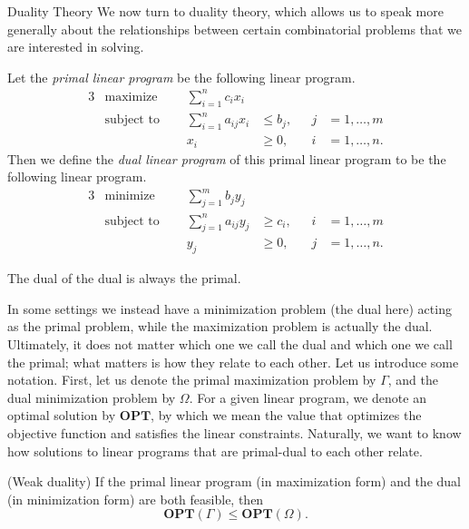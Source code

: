 \begin{section}{Duality Theory}
	We now turn to duality theory, which allows us to speak more generally about the relationships 
	between certain combinatorial problems that we are interested in solving.
	\begin{definition}
		Let the \emph{primal linear program} be the following linear program.
		\begin{alignat}{3}
			& \text{maximize } & \sum_{i=1}^{n} c_{i} x_{i}& \\
			& \text{subject to } \quad & \sum_{i=1}^{n} a_{ij} x_{i} & \leq b_{j}, & j & 
			= 1, \dots , m \\
					&& x_{i} & \geq 0, \quad & i & = 1, \dots, n.
		\end{alignat}		
		Then we define the \emph{dual linear program} of this primal linear program to be the 
		following linear program.
		\begin{alignat}{3}
			& \text{minimize } & \sum_{j=1}^{m} b_{j} y_{j}& \\
			& \text{subject to } \quad & \sum_{j=1}^{n} a_{ij} y_{j} & \geq c_{i}, & i & 
			= 1, \dots , m \\
					&& y_{j} & \geq 0, \quad & j & = 1, \dots, n.
		\end{alignat}		

		The dual of the dual is always the primal.
	\end{definition}
	In some settings we instead 
	have a minimization problem (the dual here) acting as the primal problem, while the maximization 
	problem is actually the dual. Ultimately, it does not matter which one we call the dual and
	which one we call the primal; what matters is how they relate to each other. 
	Let us introduce some 
	notation. First, let us denote the primal maximization problem by $\Gamma$, and 
	the dual minimization problem by $\Omega$. For a given linear program, we denote 
	an optimal solution by $\mathbf{OPT}$, by which we mean the value that optimizes the objective 
	function and satisfies the linear constraints. Naturally, we want to know how solutions to 
	linear programs that are primal-dual to each other relate.

	\begin{theorem}{(Weak duality)}
		If the primal linear program (in maximization form) and the dual (in minimization 
		form) are both feasible, then 
		\[
			\mathbf{OPT}(\Gamma) \leq \mathbf{OPT}(\Omega).
		\]
	\end{theorem}


\end{section}
